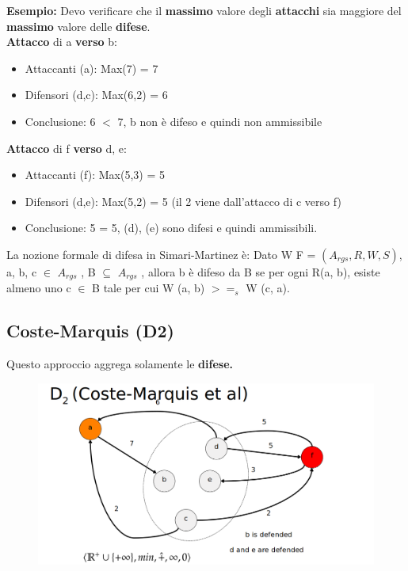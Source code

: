     \textbf{Esempio:} Devo verificare che il \textbf{massimo} valore degli \textbf{attacchi} sia maggiore del \textbf{massimo} valore delle \textbf{difese}.
    \\\textbf{Attacco} di a \textbf{verso} b:
    \begin{itemize}
        \item Attaccanti (a): Max(7) = 7
        \item Difensori (d,c): Max(6,2) = 6
        \item Conclusione: 6 $<$ 7, b non è difeso e quindi non ammissibile
    \end{itemize}
    \textbf{Attacco} di f \textbf{verso} d, e:
    \begin{itemize}
        \item  Attaccanti (f): Max(5,3) = 5
        \item Difensori (d,e): Max(5,2) = 5 (il 2 viene dall'attacco di c verso f)
        \item Conclusione: 5 = 5, (d), (e) sono difesi e quindi ammissibili.
    \end{itemize}
    La nozione formale di difesa in Simari-Martinez è: Dato W F = $(A_{rgs} , R, W, S)$, a, b, c $\in$ $A_{rgs}$ , B $\subseteq$ $A_{rgs}$ , allora b è difeso da B se per ogni R(a, b), esiste almeno uno c $\in$ B tale per cui W (a, b) $>=_s$ W (c, a).


    \subsection{Coste-Marquis (D2)}
    Questo approccio aggrega solamente le \textbf{difese.}
    \begin{figure}[H]
        \centering
        \includegraphics[width=13cm, keepaspectratio]{img/Cap6/marquis2.png}
    \end{figure}

